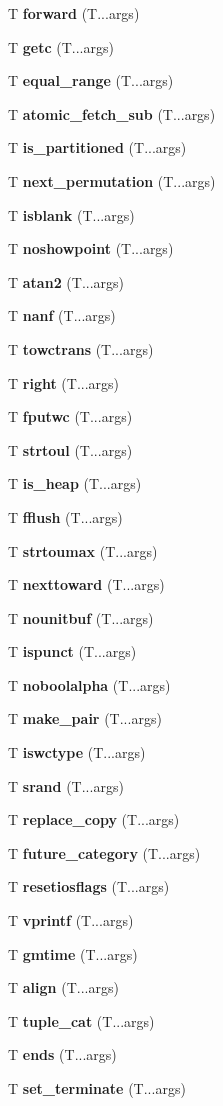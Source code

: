 \begin{DoxyCompactItemize}
T {\bf forward} (T...\+args)
\item 
T {\bf getc} (T...\+args)
\item 
T {\bf equal\+\_\+range} (T...\+args)
\item 
T {\bf atomic\+\_\+fetch\+\_\+sub} (T...\+args)
\item 
T {\bf is\+\_\+partitioned} (T...\+args)
\item 
T {\bf next\+\_\+permutation} (T...\+args)
\item 
T {\bf isblank} (T...\+args)
\item 
T {\bf noshowpoint} (T...\+args)
\item 
T {\bf atan2} (T...\+args)
\item 
T {\bf nanf} (T...\+args)
\item 
T {\bf towctrans} (T...\+args)
\item 
T {\bf right} (T...\+args)
\item 
T {\bf fputwc} (T...\+args)
\item 
T {\bf strtoul} (T...\+args)
\item 
T {\bf is\+\_\+heap} (T...\+args)
\item 
T {\bf fflush} (T...\+args)
\item 
T {\bf strtoumax} (T...\+args)
\item 
T {\bf nexttoward} (T...\+args)
\item 
T {\bf nounitbuf} (T...\+args)
\item 
T {\bf ispunct} (T...\+args)
\item 
T {\bf noboolalpha} (T...\+args)
\item 
T {\bf make\+\_\+pair} (T...\+args)
\item 
T {\bf iswctype} (T...\+args)
\item 
T {\bf srand} (T...\+args)
\item 
T {\bf replace\+\_\+copy} (T...\+args)
\item 
T {\bf future\+\_\+category} (T...\+args)
\item 
T {\bf resetiosflags} (T...\+args)
\item 
T {\bf vprintf} (T...\+args)
\item 
T {\bf gmtime} (T...\+args)
\item 
T {\bf align} (T...\+args)
\item 
T {\bf tuple\+\_\+cat} (T...\+args)
\item 
T {\bf ends} (T...\+args)
\item 
T {\bf set\+\_\+terminate} (T...\+args)
\item 

\end{DoxyCompactItemize}
